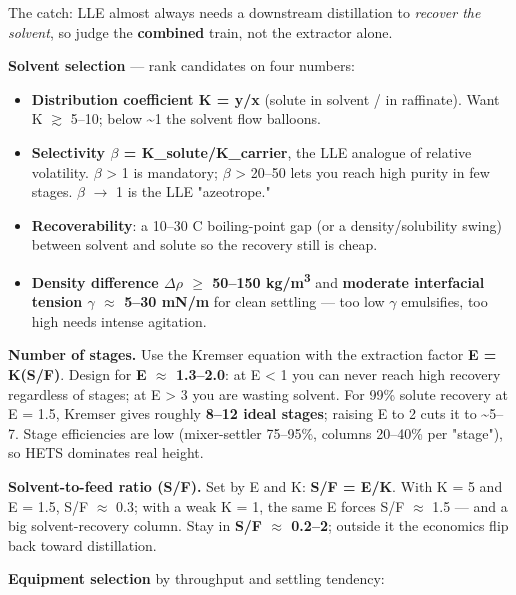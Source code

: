 \documentclass[11pt,a4paper]{article}
\providecommand{\tightlist}{\setlength{\itemsep}{0pt}\setlength{\parskip}{0pt}}
\begin{document}
The catch: LLE almost always needs a downstream distillation to
\emph{recover the solvent}, so judge the \textbf{combined} train, not
the extractor alone.

\textbf{Solvent selection} --- rank candidates on four numbers:

\begin{itemize}
\tightlist
\item
  \textbf{Distribution coefficient K = y/x} (solute in solvent / in
  raffinate). Want K \(\gtrsim\) 5--10; below \textasciitilde1 the solvent flow
  balloons.
\item
  \textbf{Selectivity \(\beta\) = K\_solute/K\_carrier}, the LLE analogue of
  relative volatility. \(\beta\) \textgreater{} 1 is mandatory; \(\beta\) \textgreater{}
  20--50 lets you reach high purity in few stages. \(\beta\) \(\rightarrow\) 1 is the LLE
  "azeotrope."
\item
  \textbf{Recoverability}: a 10--30 \textdegree{}C boiling-point gap (or a
  density/solubility swing) between solvent and solute so the recovery
  still is cheap.
\item
  \textbf{Density difference \(\Delta\)\(\rho\) \(\ge\) 50--150 kg/m\textsuperscript{3}} and \textbf{moderate
  interfacial tension \(\gamma\) \(\approx\) 5--30 mN/m} for clean settling --- too low \(\gamma\)
  emulsifies, too high needs intense agitation.
\end{itemize}

\textbf{Number of stages.} Use the Kremser equation with the extraction
factor \textbf{E = K\textperiodcentered{}(S/F)}. Design for \textbf{E \(\approx\) 1.3--2.0}: at E
\textless{} 1 you can never reach high recovery regardless of stages; at
E \textgreater{} 3 you are wasting solvent. For 99\% solute recovery at
E = 1.5, Kremser gives roughly \textbf{8--12 ideal stages}; raising E to
2 cuts it to \textasciitilde5--7. Stage efficiencies are low
(mixer-settler 75--95\%, columns 20--40\% per "stage"), so HETS
dominates real height.

\textbf{Solvent-to-feed ratio (S/F).} Set by E and K: \textbf{S/F =
E/K}. With K = 5 and E = 1.5, S/F \(\approx\) 0.3; with a weak K = 1, the same E
forces S/F \(\approx\) 1.5 --- and a big solvent-recovery column. Stay in
\textbf{S/F \(\approx\) 0.2--2}; outside it the economics flip back toward
distillation.

\textbf{Equipment selection} by throughput and settling tendency:
\end{document}

